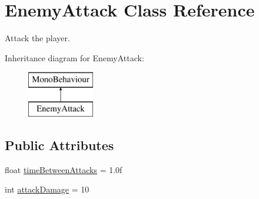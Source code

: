 \hypertarget{class_enemy_attack}{}\section{Enemy\+Attack Class Reference}
\label{class_enemy_attack}


Attack the player.  


Inheritance diagram for Enemy\+Attack\+:\begin{figure}[H]
\begin{center}
\leavevmode
\includegraphics[height=2.000000cm]{class_enemy_attack}
\end{center}
\end{figure}
\subsection*{Public Attributes}
\begin{DoxyCompactItemize}
\item 
float \mbox{\hyperlink{class_enemy_attack_afe49a1e89582f259547fe3e97cd14b4f}{time\+Between\+Attacks}} = 1.\+0f
\item 
int \mbox{\hyperlink{class_enemy_attack_a852a4228aea3ebb66a3b5b6498dcee67}{attack\+Damage}} = 10
\end{DoxyCompactItemize}

